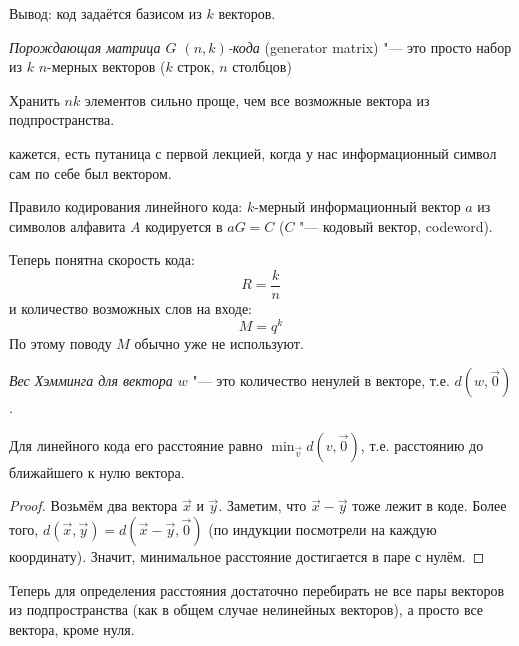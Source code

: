 Вывод: код задаётся базисом из $k$ векторов.
\begin{Def}
	\textit{Порождающая матрица $G$ $(n, k)$-кода} (generator matrix) "---
	это просто набор из $k$ $n$-мерных векторов ($k$ строк, $n$ столбцов)
\end{Def}
\begin{Rem}
	Хранить $nk$ элементов сильно проще, чем все возможные вектора из
	подпространства.
\end{Rem}

\TODO кажется, есть путаница с первой лекцией, когда у нас
информационный символ сам по себе был вектором.

\begin{Def}
	Правило кодирования линейного кода:
	$k$-мерный информационный вектор $a$ из символов алфавита $A$
	кодируется в $aG=C$ ($C$ "--- кодовый вектор, codeword).
\end{Def}
\begin{Rem}
	Теперь понятна скорость кода:
	\[
		R = \frac{k}{n}
	\]
	и количество возможных слов на входе:
	\[
		M = q^k
	\]
	По этому поводу $M$ обычно уже не используют.
\end{Rem}

\begin{Def}
	\textit{Вес Хэмминга для вектора $w$} "--- это количество ненулей в векторе,
	т.е. $d(w, \vec 0)$.
\end{Def}
\begin{lemma}
	Для линейного кода его расстояние равно $\min_{\vec v} d(v, \vec 0)$,
	т.е. расстоянию до ближайшего к нулю вектора.
\end{lemma}
\begin{proof}
	Возьмём два вектора $\vec x$ и $\vec y$.
	Заметим, что $\vec x - \vec y$ тоже лежит в коде.
	Более того, $d(\vec x, \vec y) = d(\vec x - \vec y, \vec 0)$
	(по индукции посмотрели на каждую координату).
	Значит, минимальное расстояние достигается в паре с нулём.
\end{proof}
\begin{Rem}
	Теперь для определения расстояния достаточно перебирать
	не все пары векторов из подпространства (как в общем случае нелинейных векторов),
	а просто все вектора, кроме нуля.
\end{Rem}

